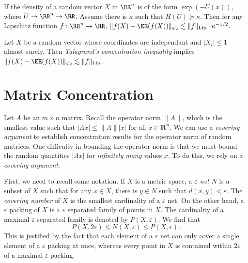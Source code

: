 \begin{example}
    If the density of a random vector $X$ in $\RR^n$ is of the form $\exp(-U(x))$, where $U \to \RR^n \to \RR$. Assume there is $\kappa$ such that $H(U) \succeq \kappa$. Then for any Lipschitz function $f: \RR^n \to \RR$, $\| f(X) - \EE(f(X)) \|_{\psi_2} \lesssim \| f \|_{\text{Lip}} \cdot \kappa^{-1/2}$.
\end{example}

\begin{example}
    Let $X$ be a random vector whose coordinates are independant and $|X_i| \leq 1$ almost surely. Then \emph{Talagrand's concentration inequality} implies $\| f(X) - \EE(f(X)) \|_{\psi_2} \lesssim \| f \|_{\text{Lip}}$.
\end{example}




\section{Matrix Concentration}

Let $A$ be an $m \times n$ matrix. Recall the operator norm $\| A \|$, which is the smallest value such that $|Ax| \leq \| A \| |x|$ for all $x \in \mathbf{R}^n$. We can use a {\it covering argument} to establish concentration results for the operator norm of random matrices. One difficulty in bounding the operator norm is that we must bound the random quantities $|Ax|$ for {\it infinitely many} values $x$. To do this, we rely on a {\it covering argument}.

First, we need to recall some notation. If $X$ is a metric space, a {\it $\varepsilon$ net} $N$ is a subset of $X$ such that for any $x \in X$, there is $y \in N$ such that $d(x,y) < \varepsilon$. The {\it covering number} of $X$ is the smallest cardinality of a $\varepsilon$ net. On the other hand, a $\varepsilon$ packing of $X$ is a $\varepsilon$ separated family of points in $X$. The cardinality of a maximal $\varepsilon$ separated family is denoted by $P(X,\varepsilon)$. We find that
%
\[ P(X,2\varepsilon) \leq N(X,\varepsilon) \leq P(X,\varepsilon). \]
%
This is justified by the fact that each element of a $\varepsilon$ net can only cover a single element of a $\varepsilon$ packing at once, whereas every point in $X$ is contained within $2\varepsilon$ of a maximal $\varepsilon$ packing.

